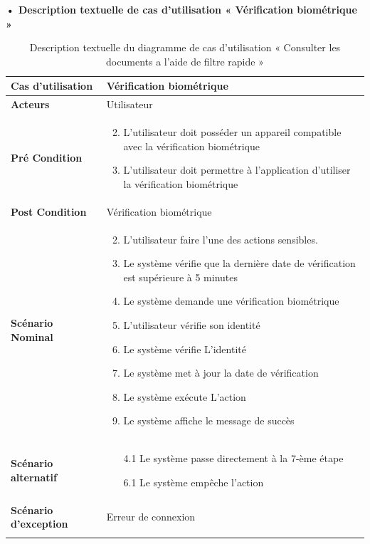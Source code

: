 \textbf{•	Description textuelle de cas d'utilisation « Vérification biométrique  »}

\begin{longtable}{|p{5cm}|p{10cm}|}
\hline
\textbf{Cas d'utilisation}&Vérification biométrique \\
\hline
\textbf{Acteurs}&Utilisateur \\
\hline
\textbf{Pré Condition}&
\vspace{-\baselineskip}
\begin{enumerate}
  \setcounter{enumi}{1}
  \item L'utilisateur doit posséder un appareil compatible avec la vérification biométrique
  \item L'utilisateur doit permettre à l'application d'utiliser la vérification biométrique
\end{enumerate}\\
\hline
\textbf{Post Condition}&Vérification biométrique\\
\hline
\textbf{Scénario Nominal}&
\vspace{-\baselineskip}
\begin{enumerate}
    \setcounter{enumi}{1}
    \item L'utilisateur faire l'une des actions sensibles.
    \item Le système vérifie que la dernière date de vérification est supérieure à 5 minutes 
    \item Le système demande une vérification biométrique
    \item L'utilisateur vérifie son identité
    \item Le système vérifie L'identité 
    \item Le système met à jour la date de vérification
    \item Le système exécute L'action
    \item Le système affiche le message de succès
    
\end{enumerate}\\
\hline
\textbf{Scénario alternatif}&
\vspace{-\baselineskip}
\begin{enumerate}
  \item [4.1] Le système passe directement à la 7-ème étape 
  \item [6.1] Le système empêche l'action  
\end{enumerate}\\
\hline
\textbf{Scénario d'exception}&Erreur de connexion\\
\hline
\caption{Description textuelle du diagramme de cas d'utilisation « Consulter les documents a l'aide de filtre rapide »}
\label{tab:use_case_biometric_verification}
\end{longtable}

